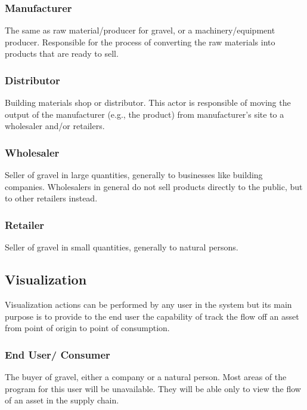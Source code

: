 \subsubsection{Manufacturer}\label{sec:Manufacturer}
The same as raw material/producer for gravel, or a machinery/equipment producer. Responsible for the process of converting the raw materials into products that are ready to sell.

\subsubsection{Distributor}\label{sec:Distributor}
Building materials shop or distributor. This actor is responsible of moving the output of the manufacturer (e.g., the product) from manufacturer’s site to a wholesaler and/or retailers.

\subsubsection{Wholesaler}\label{sec:Wholesaler}
Seller of gravel in large quantities, generally to businesses like building companies. Wholesalers in general do not sell products directly to the public, but to other retailers instead.

\subsubsection{Retailer}\label{sec:Retailer}
Seller of gravel in small quantities, generally to natural persons.



\subsection{Visualization}\label{sec:Visualization}

Visualization actions can be performed by any user in the system but its main purpose is to provide to the end user the capability of track the flow off an asset from point of origin to point of consumption.

\subsubsection{End User/ Consumer}\label{sec:EndUser}
The buyer of gravel, either a company or a natural person. Most areas of the program for this user will be unavailable. They will be able only to view the flow of an asset in the supply chain.